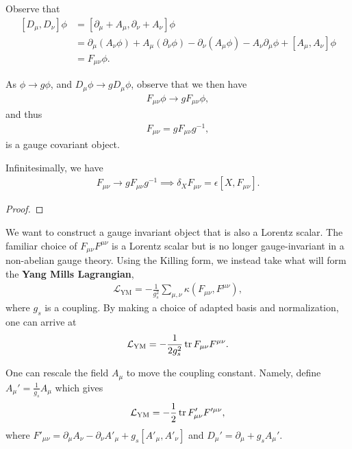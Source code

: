 Observe that
\begin{align}
    \left[ D_\mu, D_{\nu} \right] \phi &= \left[ \partial_\mu + A_\mu, \partial_\nu + A_\nu \right] \phi \\
    &= \partial_\mu \left( A_\nu \phi \right) + A_\mu \left( \partial_\nu \phi \right) - \partial_\nu \left( A_\mu \phi \right) - A_\nu \partial_\mu \phi + \left[ A_\mu, A_\nu \right] \phi \\
    &= F_{\mu \nu} \phi 
.\end{align}

As $\phi \to g \phi$, and $D_\mu \phi \to g D_\mu \phi$, observe that we then have
\begin{align}
    F_{\mu \nu} \phi \to g F_{\mu \nu} \phi
,\end{align}
and thus
\begin{align}
    F_{\mu \nu} = g F_{\mu \nu} g^{-1}
,\end{align}
is a gauge covariant object.

Infinitesimally, we have
\begin{align}
    F_{\mu \nu} \to g F_{\mu \nu} g^{-1} \implies \delta_X F_{\mu \nu} = \epsilon \left[ X, F_{\mu \nu} \right] 
.\end{align}

\begin{proof}
    
\end{proof}

We want to construct a gauge invariant object that is also a Lorentz scalar. The familiar choice of $F_{\mu \nu} F^{\mu \nu}$ is a Lorentz scalar but is no longer gauge-invariant in a non-abelian gauge theory. Using the Killing form, we instead take what will form the \textbf{Yang Mills Lagrangian},
\begin{align}
    \mathcal{L}_{\text{YM}} = -\frac{1}{g_s^2} \sum_{\mu, \nu}^{} \kappa \left( F_{\mu \nu}, F^{\mu \nu} \right) 
,\end{align}
where $g_s$ is a coupling. By making a choice of adapted basis and normalization, one can arrive at
\begin{align}
    \mathcal{L}_{\text{YM}} = -\frac{1}{2g_s^2} \tr F_{\mu \nu} F^{\mu \nu}
.\end{align}

One can rescale the field $A_\mu$ to move the coupling constant. Namely, define $A_\mu ' = \frac{1}{g_s} A_\mu$ which gives
\begin{align}
    \mathcal{L}_\text{YM} = -\frac{1}{2} \tr F_{\mu \nu}' F'^{\mu \nu}
,\end{align}
where $F'_{\mu \nu} = \partial_\mu A_\nu - \partial_\nu A'_\mu + g_s \left[ A'_\mu, A'_\nu \right]$ and $D_\mu' = \partial_\mu + g_s A_\mu'$.

